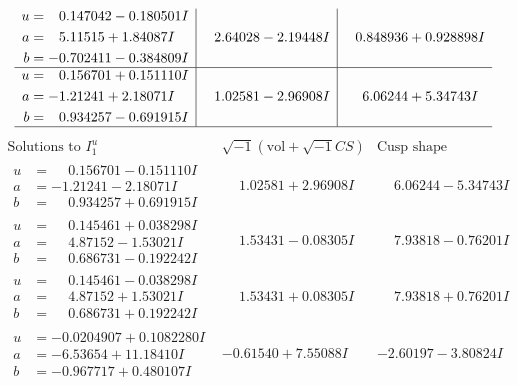 \documentclass[1p]{elsarticle_modified}
\theoremstyle{definition}
\newcommand{\I}{\sqrt{-1}}
\begin{document}
$$\begin{array}{c|c|c}
\begin{aligned}
u &= \phantom{-}0.147042 - 0.180501 I \\
a &= \phantom{-}5.11515 + 1.84087 I \\
b &= -0.702411 - 0.384809 I\end{aligned}
 & \phantom{-}2.64028 - 2.19448 I & \phantom{-}0.848936 + 0.928898 I \\ \hline\begin{aligned}
u &= \phantom{-}0.156701 + 0.151110 I \\
a &= -1.21241 + 2.18071 I \\
b &= \phantom{-}0.934257 - 0.691915 I\end{aligned}
 & \phantom{-}1.02581 - 2.96908 I & \phantom{-}6.06244 + 5.34743 I\\
 \hline 
 \end{array}$$\newpage$$\begin{array}{c|c|c}  
\text{Solutions to }I^u_{1}& \I (\text{vol} + \sqrt{-1}CS) & \text{Cusp shape}\\
 \hline 
\begin{aligned}
u &= \phantom{-}0.156701 - 0.151110 I \\
a &= -1.21241 - 2.18071 I \\
b &= \phantom{-}0.934257 + 0.691915 I\end{aligned}
 & \phantom{-}1.02581 + 2.96908 I & \phantom{-}6.06244 - 5.34743 I \\ \hline\begin{aligned}
u &= \phantom{-}0.145461 + 0.038298 I \\
a &= \phantom{-}4.87152 - 1.53021 I \\
b &= \phantom{-}0.686731 - 0.192242 I\end{aligned}
 & \phantom{-}1.53431 - 0.08305 I & \phantom{-}7.93818 - 0.76201 I \\ \hline\begin{aligned}
u &= \phantom{-}0.145461 - 0.038298 I \\
a &= \phantom{-}4.87152 + 1.53021 I \\
b &= \phantom{-}0.686731 + 0.192242 I\end{aligned}
 & \phantom{-}1.53431 + 0.08305 I & \phantom{-}7.93818 + 0.76201 I \\ \hline\begin{aligned}
u &= -0.0204907 + 0.1082280 I \\
a &= -6.53654 + 11.18410 I \\
b &= -0.967717 + 0.480107 I\end{aligned}
 & -0.61540 + 7.55088 I & -2.60197 - 3.80824 I \\ \hline\begin{aligned}

\end{aligned}
\end{array}$$
\end{document}
